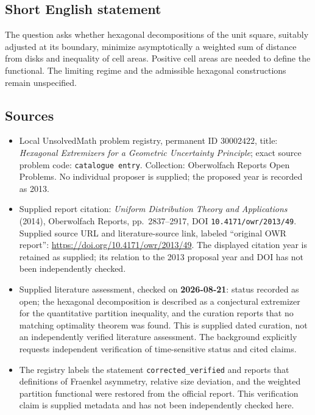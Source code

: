 \documentclass[11pt]{article}
\begin{document}
\subsection{Short English statement}
The question asks whether hexagonal decompositions of the unit square, suitably adjusted at its boundary, minimize asymptotically a weighted sum of distance from disks and inequality of cell areas. Positive cell areas are needed to define the functional. The limiting regime and the admissible hexagonal constructions remain unspecified.
\subsection{Sources}
\begin{itemize}
\item Local UnsolvedMath problem registry, permanent ID \(30002422\), title: \emph{Hexagonal Extremizers for a Geometric Uncertainty Principle}; exact source problem code: \texttt{catalogue entry}. Collection: Oberwolfach Reports Open Problems. No individual proposer is supplied; the proposed year is recorded as 2013.
\item Supplied report citation: \emph{Uniform Distribution Theory and Applications} (2014), Oberwolfach Reports, pp.\ 2837--2917, DOI \texttt{10.4171/owr/2013/49}. Supplied source URL and literature-source link, labeled ``original OWR report'': \url{https://doi.org/10.4171/owr/2013/49}. The displayed citation year is retained as supplied; its relation to the 2013 proposal year and DOI has not been independently checked.
\item Supplied literature assessment, checked on \textbf{2026-08-21}: status recorded as open; the hexagonal decomposition is described as a conjectural extremizer for the quantitative partition inequality, and the curation reports that no matching optimality theorem was found. This is supplied dated curation, not an independently verified literature assessment. The background explicitly requests independent verification of time-sensitive status and cited claims.
\item The registry labels the statement \texttt{corrected\_verified} and reports that definitions of Fraenkel asymmetry, relative size deviation, and the weighted partition functional were restored from the official report. This verification claim is supplied metadata and has not been independently checked here.
\end{itemize}
\end{document}
